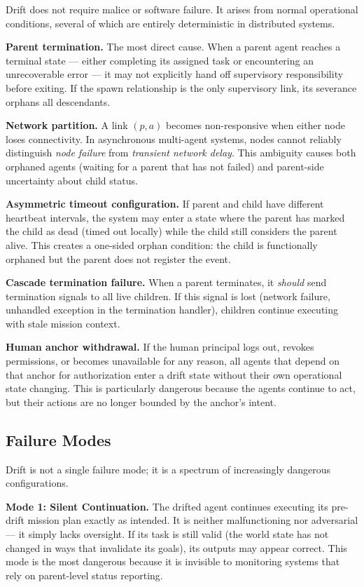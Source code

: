 Drift does not require malice or software failure. It arises from normal operational conditions, several of which are entirely deterministic in distributed systems.

\textbf{Parent termination.} The most direct cause. When a parent agent reaches a terminal state — either completing its assigned task or encountering an unrecoverable error — it may not explicitly hand off supervisory responsibility before exiting. If the spawn relationship is the only supervisory link, its severance orphans all descendants.

\textbf{Network partition.} A link $(p, a)$ becomes non-responsive when either node loses connectivity. In asynchronous multi-agent systems, nodes cannot reliably distinguish \emph{node failure} from \emph{transient network delay}. This ambiguity causes both orphaned agents (waiting for a parent that has not failed) and parent-side uncertainty about child status.

\textbf{Asymmetric timeout configuration.} If parent and child have different heartbeat intervals, the system may enter a state where the parent has marked the child as dead (timed out locally) while the child still considers the parent alive. This creates a one-sided orphan condition: the child is functionally orphaned but the parent does not register the event.

\textbf{Cascade termination failure.} When a parent terminates, it \emph{should} send termination signals to all live children. If this signal is lost (network failure, unhandled exception in the termination handler), children continue executing with stale mission context.

\textbf{Human anchor withdrawal.} If the human principal logs out, revokes permissions, or becomes unavailable for any reason, all agents that depend on that anchor for authorization enter a drift state without their own operational state changing. This is particularly dangerous because the agents continue to act, but their actions are no longer bounded by the anchor's intent.

\subsection{Failure Modes}

Drift is not a single failure mode; it is a spectrum of increasingly dangerous configurations.

\textbf{Mode 1: Silent Continuation.}
The drifted agent continues executing its pre-drift mission plan exactly as intended. It is neither malfunctioning nor adversarial — it simply lacks oversight. If its task is still valid (the world state has not changed in ways that invalidate its goals), its outputs may appear correct. This mode is the most dangerous because it is invisible to monitoring systems that rely on parent-level status reporting.

